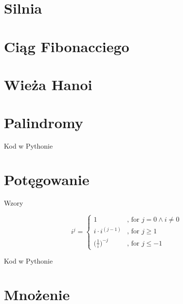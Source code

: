 
\section{Silnia}\label{sec:factorial}



\section{Ciąg Fibonacciego}\label{sec:fibonacci}



\section{Wieża Hanoi}\label{sec:hanoi}



\section{Palindromy}\label{sec:palindrome}
\begin{frame}[fragile]{Kod w Pythonie}
    
\end{frame}


\section{Potęgowanie}\label{sec:exponentiation}
\begin{frame}{Wzory}
    \begin{definition}[recursion]
        \[ i^j =
        \begin{cases}
            1 & \text{, for } j = 0 \land i \neq 0 \\
            i \cdot i^{(j-1)} & \text{, for } j \geq 1 \\
            \Big( \frac{1}{i} \Big) ^{-j} & \text{, for } j \leq -1
        \end{cases}
        \]
    \end{definition}
\end{frame}
\begin{frame}{Kod w Pythonie}
    
    
\end{frame}


\section{Mnożenie}\label{sec:multiplication}



